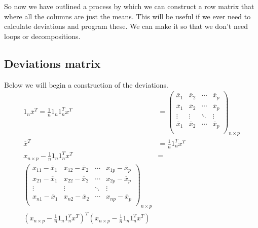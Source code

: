 So now we have outlined a process by which we can construct a row matrix that where all the columns are just the means. This will be useful if we ever need to calculate deviations and program these. We can make it so that we don't need loops or decompositions.

\subsection{Deviations matrix}
Below we will begin a construction of the deviations.
\begin{align*}
1_n\overline{x}^T = \frac{1}{n}1_n1_n^T x^T &=
\begin{pmatrix}
    \overline{x}_1 & \overline{x}_2 & \cdots & \overline{x}_p \\
    \overline{x}_1 & \overline{x}_2 & \cdots & \overline{x}_p \\
    \vdots & \vdots & \ddots & \vdots \\
    \overline{x}_1 & \overline{x}_2 & \cdots & \overline{x}_p \\ \end{pmatrix}_{n\times p} \\
    \overline{x}^T &= \frac{1}{n}1_n^T x^T
    \\
    x_{n\times p} - \frac{1}{n}1_n1_n^T x^T &=\\
\begin{pmatrix}
    x_{11}-\overline{x}_1 & x_{12}-\overline{x}_2 & \cdots & x_{1p}- \overline{x}_p \\
    x_{21}-\overline{x}_1 & x_{22}-\overline{x}_2 & \cdots & x_{2p}- \overline{x}_p \\
    \vdots & \vdots & \ddots & \vdots \\
    x_{n1}-\overline{x}_1 & x_{n2}-\overline{x}_2 & \cdots & x_{np}- \overline{x}_p \\ \end{pmatrix}_{n\times p}
    \\
    (x_{n\times p} - \frac{1}{n}1_n1_n^T x^T)^T(x_{n\times p} - \frac{1}{n}1_n1_n^T x^T) 
\end{align*}
